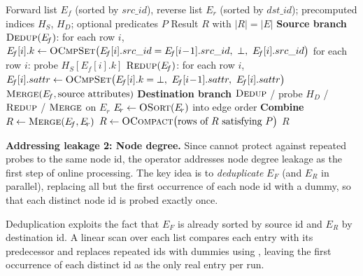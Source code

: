 \begin{algorithm*}[t]
\caption{Oblivious \onehop Operator}
\label{alg:onehop}
\begin{algorithmic}[1]
\Require Forward list $E_{\!f}$ (sorted by $src\_id$), reverse list $E_{\!r}$
         (sorted by $dst\_id$); precomputed indices $H_S$, $H_D$; optional
         predicates $P$
\Ensure  Result $R$ with $|R| = |E|$
\Statex
\State \textbf{Source branch} 
\State $\textsc{Dedup}(E_{\!f})$: for each row $i$,
       $E_{\!f}[i].k \gets \textsc{OCmpSet}\big(E_{\!f}[i].src\_id = E_{\!f}[i\!-\!1].src\_id,\ \bot,\ E_{\!f}[i].src\_id\big)$
\State for each row $i$: probe $H_S[E_{\!f}[i].k]$ 
\State $\textsc{Redup}(E_{\!f})$: for each row $i$,
       $E_{\!f}[i].sattr \gets \textsc{OCmpSet}\big(E_{\!f}[i].k = \bot,\ E_{\!f}[i\!-\!1].sattr,\ E_{\!f}[i].sattr\big)$
\State $\textsc{Merge}(E_{\!f}, \text{source attributes})$ 
\Statex
\State \textbf{Destination branch} 
\State $\textsc{Dedup}$ / probe $H_D$ / $\textsc{Redup}$ / $\textsc{Merge}$ on $E_{\!r}$
\State $E_{\!r} \gets \textsc{OSort}(E_{\!r})$ into edge order 
\Statex
\State \textbf{Combine}
\State $R \gets \textsc{Merge}(E_{\!f}, E_{\!r})$ 
 
    \State $R \gets \textsc{OCompact}\big(\text{rows of } R \text{ satisfying } P\big)$
\EndIf
\State \Return $R$
\end{algorithmic}
\end{algorithm*}

\noindent\textbf{Addressing leakage 2: Node degree.}
Since \ohts cannot protect against repeated probes to the same node id, the 
\onehop operator addresses node degree leakage as the first step of online 
processing. The key idea is to \emph{deduplicate} $E_F$ (and $E_R$ in 
parallel), replacing all but the first occurrence of each node id with a 
dummy, so that each distinct node id is probed exactly once.

Deduplication exploits the fact that $E_F$ is already sorted by source id 
and $E_R$ by destination id. A linear scan over each list compares each 
entry with its predecessor and replaces repeated ids with dummies using 
\cmpset, leaving the first occurrence of each distinct id as the only real
entry per run.

